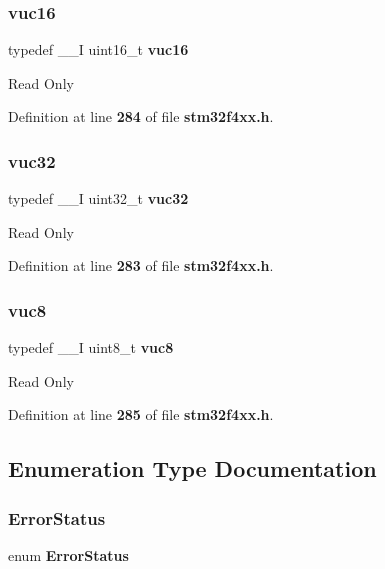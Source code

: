 \subsubsection{vuc16}
{\footnotesize\ttfamily typedef \+\_\+\+\_\+I uint16\+\_\+t \textbf{ vuc16}}

Read Only 

Definition at line \textbf{ 284} of file \textbf{ stm32f4xx.\+h}.

\mbox{\label{group__Exported__types_ga2e08e321a35a55e72c5b3a507e76371f}} 
\subsubsection{vuc32}
{\footnotesize\ttfamily typedef \+\_\+\+\_\+I uint32\+\_\+t \textbf{ vuc32}}

Read Only 

Definition at line \textbf{ 283} of file \textbf{ stm32f4xx.\+h}.

\mbox{\label{group__Exported__types_gab0ec90ac9b2c5864755998c8d37c264a}} 
\subsubsection{vuc8}
{\footnotesize\ttfamily typedef \+\_\+\+\_\+I uint8\+\_\+t \textbf{ vuc8}}

Read Only 

Definition at line \textbf{ 285} of file \textbf{ stm32f4xx.\+h}.



\subsection{Enumeration Type Documentation}
\mbox{\label{group__Exported__types_ga8333b96c67f83cba354b3407fcbb6ee8}} 
\subsubsection{Error\+Status}
{\footnotesize\ttfamily enum \textbf{ Error\+Status}}


